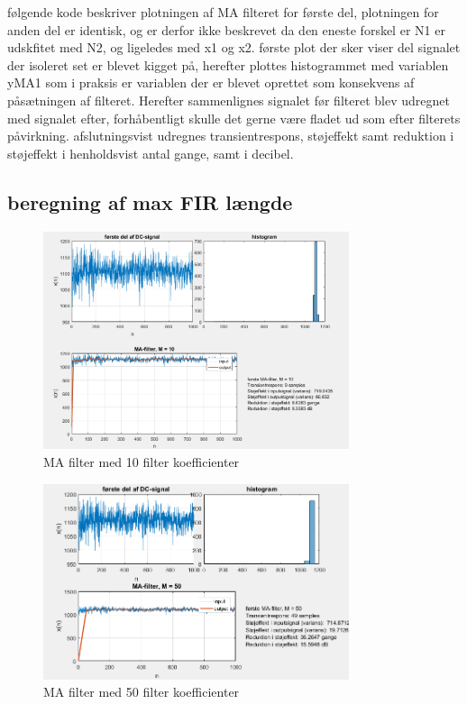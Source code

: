 \documentclass{article}
\begin{document}
følgende kode beskriver plotningen af MA filteret for første del, plotningen for anden del er identisk, og er derfor ikke beskrevet da den eneste forskel er N1 er udskfitet med N2, og ligeledes med x1 og x2.
første plot der sker viser del signalet der isoleret set er blevet kigget på, herefter plottes histogrammet med variablen yMA1 som i praksis er variablen der er blevet oprettet som konsekvens af påsætningen af filteret.
Herefter sammenlignes signalet før filteret blev udregnet med signalet efter, forhåbentligt skulle det gerne være fladet ud som efter filterets påvirkning.
afslutningsvist udregnes transientrespons, støjeffekt samt reduktion i støjeffekt i henholdsvist antal gange, samt i decibel.

\subsection{beregning af max FIR længde}
\label{sec:beregning}
\begin{figure}[h!]
  \centering
  \includegraphics[width=0.8\textwidth]{rod/1MAfilter10.png}
  \caption{MA filter med 10 filter koefficienter}
  \label{fig:MA10}
\end{figure}

\begin{figure}[h!]
  \centering
  \includegraphics[width=0.8\textwidth]{rod/1MAfilter50.png}
  \caption{MA filter med 50 filter koefficienter}
  \label{fig:MA50}
\end{figure}
\end{document}
